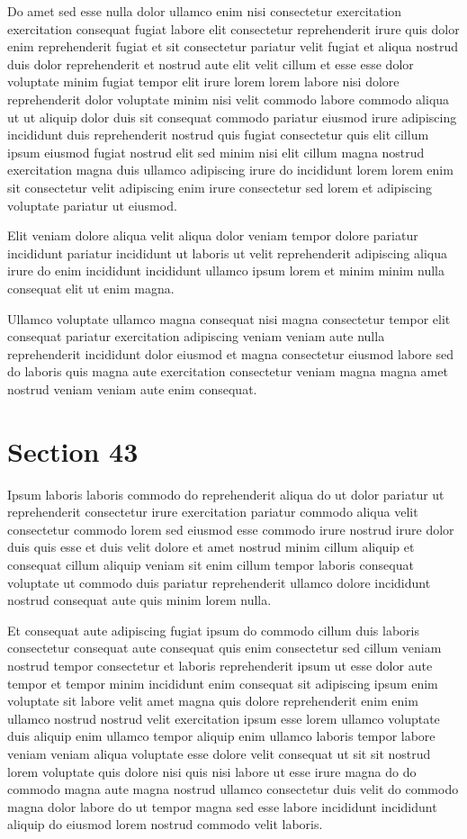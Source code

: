 \documentclass{article}
\begin{document}
Do amet sed esse nulla dolor ullamco enim nisi consectetur exercitation exercitation consequat fugiat labore elit consectetur reprehenderit irure quis dolor enim reprehenderit fugiat et sit consectetur pariatur velit fugiat et aliqua nostrud duis dolor reprehenderit et nostrud aute elit velit cillum et esse esse dolor voluptate minim fugiat tempor elit irure lorem lorem labore nisi dolore reprehenderit dolor voluptate minim nisi velit commodo labore commodo aliqua ut ut aliquip dolor duis sit consequat commodo pariatur eiusmod irure adipiscing incididunt duis reprehenderit nostrud quis fugiat consectetur quis elit cillum ipsum eiusmod fugiat nostrud elit sed minim nisi elit cillum magna nostrud exercitation magna duis ullamco adipiscing irure do incididunt lorem lorem enim sit consectetur velit adipiscing enim irure consectetur sed lorem et adipiscing voluptate pariatur ut eiusmod.

Elit veniam dolore aliqua velit aliqua dolor veniam tempor dolore pariatur incididunt pariatur incididunt ut laboris ut velit reprehenderit adipiscing aliqua irure do enim incididunt incididunt ullamco ipsum lorem et minim minim nulla consequat elit ut enim magna.

Ullamco voluptate ullamco magna consequat nisi magna consectetur tempor elit consequat pariatur exercitation adipiscing veniam veniam aute nulla reprehenderit incididunt dolor eiusmod et magna consectetur eiusmod labore sed do laboris quis magna aute exercitation consectetur veniam magna magna amet nostrud veniam veniam aute enim consequat.

\section{Section 43}
Ipsum laboris laboris commodo do reprehenderit aliqua do ut dolor pariatur ut reprehenderit consectetur irure exercitation pariatur commodo aliqua velit consectetur commodo lorem sed eiusmod esse commodo irure nostrud irure dolor duis quis esse et duis velit dolore et amet nostrud minim cillum aliquip et consequat cillum aliquip veniam sit enim cillum tempor laboris consequat voluptate ut commodo duis pariatur reprehenderit ullamco dolore incididunt nostrud consequat aute quis minim lorem nulla.

Et consequat aute adipiscing fugiat ipsum do commodo cillum duis laboris consectetur consequat aute consequat quis enim consectetur sed cillum veniam nostrud tempor consectetur et laboris reprehenderit ipsum ut esse dolor aute tempor et tempor minim incididunt enim consequat sit adipiscing ipsum enim voluptate sit labore velit amet magna quis dolore reprehenderit enim enim ullamco nostrud nostrud velit exercitation ipsum esse lorem ullamco voluptate duis aliquip enim ullamco tempor aliquip enim ullamco laboris tempor labore veniam veniam aliqua voluptate esse dolore velit consequat ut sit sit nostrud lorem voluptate quis dolore nisi quis nisi labore ut esse irure magna do do commodo magna aute magna nostrud ullamco consectetur duis velit do commodo magna dolor labore do ut tempor magna sed esse labore incididunt incididunt aliquip do eiusmod lorem nostrud commodo velit laboris.
\end{document}
